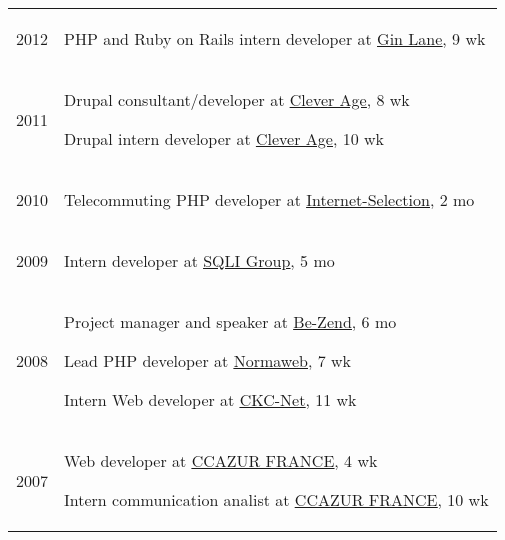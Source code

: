 \documentclass[letterpaper]{article}
\renewenvironment{itemize}{
    \begin{list}{}{
        \setlength{\leftmargin}{1.5em}
    }
}{
    \end{list}
}
\begin{document}
        \setlength{\tabcolsep}{0.6cm}
        \begin{tabular}{p{1cm}p{\textwidth}}
            \large{2012} & \begin{itemize}
                \item PHP and Ruby on Rails intern developer at \uline{\href{http://www.ginlanemedia.com}{Gin Lane}}, 9 wk
            \end{itemize} \\
            \large{2011} & \begin{itemize}
                \item Drupal consultant/developer at \uline{\href{http://www.cleverage.com}{Clever Age}}, 8 wk
                \item Drupal intern developer at \uline{\href{http://www.cleverage.com}{Clever Age}}, 10 wk
            \end{itemize} \\
            \large{2010} &  \begin{itemize}
                \item Telecommuting PHP developer at \uline{\href{http://www.internet-selection.net}{Internet-Selection}}, 2 mo
            \end{itemize} \\
            \large{2009} &  \begin{itemize}
                \item Intern developer at \uline{\href{http://www.sqli.com}{SQLI Group}}, 5 mo
            \end{itemize} \\
            \large{2008} &  \begin{itemize}
                \item Project manager and speaker at \uline{\href{htt://www.be-zend.org}{Be-Zend}}, 6 mo
                \item Lead PHP developer at \uline{\href{http://www.normaweb.fr}{Normaweb}}, 7 wk
                \item Intern Web developer at \uline{\href{http://www.ckc-net.com}{CKC-Net}}, 11 wk
            \end{itemize} \\
            \large{2007} &  \begin{itemize}
                \item Web developer at \uline{\href{http://www.ccazur.com}{CCAZUR FRANCE}}, 4 wk
                \item Intern communication analist at \uline{\href{http://www.ccazur.com}{CCAZUR FRANCE}}, 10 wk
            \end{itemize}
        \end{tabular}
        
\end{document}
